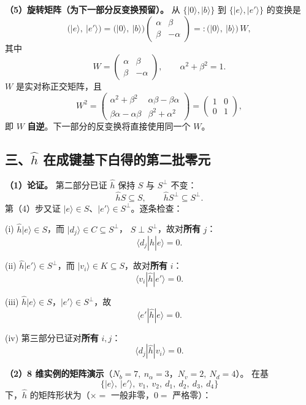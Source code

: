 \documentclass[11pt]{ctexart}
\begin{document}
\textbf{（5）旋转矩阵（为下一部分反变换预留）。}
从 $\{|0\rangle,|b\rangle\}$ 到 $\{|e\rangle,|e'\rangle\}$ 的变换是
\[
\big(|e\rangle,\ |e'\rangle\big)
=
\big(|0\rangle,\ |b\rangle\big)
\begin{pmatrix}
\alpha & \beta\\
\beta & -\alpha
\end{pmatrix}
=:
\big(|0\rangle,\ |b\rangle\big)\,W ,
\]
其中
\[
W=\begin{pmatrix}\alpha&\beta\\ \beta&-\alpha\end{pmatrix},
\qquad
\alpha^2+\beta^2=1 .
\]
$W$ 是实对称正交矩阵，且
\[
W^2=
\begin{pmatrix}\alpha^2+\beta^2&\alpha\beta-\beta\alpha\\
\beta\alpha-\alpha\beta&\beta^2+\alpha^2\end{pmatrix}
=
\begin{pmatrix}1&0\\0&1\end{pmatrix} ,
\]
即 $W$ \textbf{自逆}。下一部分的反变换将直接使用同一个 $W$。

\subsection{三、$\hat h$ 在成键基下白得的第二批零元}

\textbf{（1）论证。}
第二部分已证 $\hat h$ 保持 $S$ 与 $S^{\perp}$ 不变：
\[
\hat h S\subseteq S,\qquad \hat h S^{\perp}\subseteq S^{\perp} .
\]
第（4）步又证 $|e\rangle\in S$、$|e'\rangle\in S^{\perp}$。逐条检查：

(i) $\hat h|e\rangle\in S$，而 $|d_j\rangle\in C\subseteq S^{\perp}$，
$S\perp S^{\perp}$，故对\textbf{所有} $j$：
\[
\langle d_j|\hat h|e\rangle=0 .
\]

(ii) $\hat h|e'\rangle\in S^{\perp}$，而 $|v_i\rangle\in K\subseteq S$，故对\textbf{所有} $i$：
\[
\langle v_i|\hat h|e'\rangle=0 .
\]

(iii) $\hat h|e\rangle\in S$，$|e'\rangle\in S^{\perp}$，故
\[
\langle e'|\hat h|e\rangle=0 .
\]

(iv) 第三部分已证对\textbf{所有} $i,j$：
\[
\langle d_j|\hat h|v_i\rangle=0 .
\]

\textbf{（2）8 维实例的矩阵演示}（$N_b=7,\ n_\alpha=3$，$N_v=2,\ N_d=4$）。
在基
\[
\big\{|e\rangle,\ |e'\rangle,\ v_1,\ v_2,\ d_1,\ d_2,\ d_3,\ d_4\big\}
\]
下，$\hat h$ 的矩阵形状为（$\times=$ 一般非零，$0=$ 严格零）：
\end{document}
